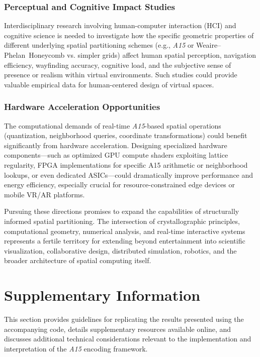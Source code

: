 \documentclass[10pt]{article}
\def\AAAB{\textit{A15}}
\def\WP{Weaire--Phelan}
\def\WPH{\WP{}~Honeycomb}
\begin{document}
\subsubsection{Perceptual and Cognitive Impact Studies}\label{subsubsec:outlook-perception}
Interdisciplinary research involving human-computer interaction (HCI) and cognitive science is needed to investigate how the specific geometric properties of different underlying spatial partitioning schemes (e.g., \AAAB{} or \WPH{} vs. simpler grids) affect human spatial perception, navigation efficiency, wayfinding accuracy, cognitive load, and the subjective sense of presence or realism within virtual environments. Such studies could provide valuable empirical data for human-centered design of virtual spaces.

\subsubsection{Hardware Acceleration Opportunities}\label{subsubsec:outlook-hardware}
The computational demands of real-time \AAAB{}-based spatial operations (quantization, neighborhood queries, coordinate transformations) could benefit significantly from hardware acceleration. Designing specialized hardware components—such as optimized GPU compute shaders exploiting lattice regularity, FPGA implementations for specific A15 arithmetic or neighborhood lookups, or even dedicated ASICs—could dramatically improve performance and energy efficiency, especially crucial for resource-constrained edge devices or mobile VR/AR platforms.

\vspace{\parskip}
Pursuing these directions promises to expand the capabilities of structurally informed spatial partitioning. The intersection of crystallographic principles, computational geometry, numerical analysis, and real-time interactive systems represents a fertile territory for extending beyond entertainment into scientific visualization, collaborative design, distributed simulation, robotics, and the broader architecture of spatial computing itself.

\section{Supplementary Information}\label{sec:supplementary}

This section provides guidelines for replicating the results presented using the accompanying code, details supplementary resources available online, and discusses additional technical considerations relevant to the implementation and interpretation of the \AAAB{} encoding framework.
\end{document}
